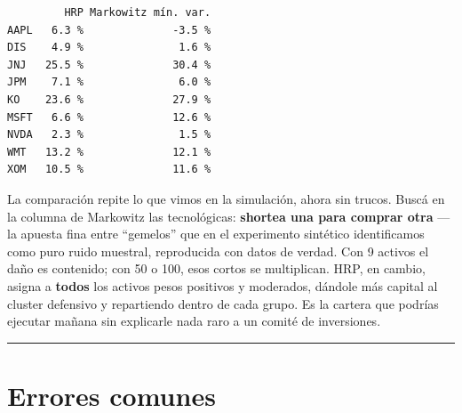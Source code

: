 \documentclass[
  spanish,
  letterpaper,
  DIV=11,
  numbers=noendperiod]{scrreprt}
\begin{document}
\begin{verbatim}
         HRP Markowitz mín. var.
AAPL   6.3 %              -3.5 %
DIS    4.9 %               1.6 %
JNJ   25.5 %              30.4 %
JPM    7.1 %               6.0 %
KO    23.6 %              27.9 %
MSFT   6.6 %              12.6 %
NVDA   2.3 %               1.5 %
WMT   13.2 %              12.1 %
XOM   10.5 %              11.6 %
\end{verbatim}

La comparación repite lo que vimos en la simulación, ahora sin trucos.
Buscá en la columna de Markowitz las tecnológicas: \textbf{shortea una
para comprar otra} --- la apuesta fina entre ``gemelos'' que en el
experimento sintético identificamos como puro ruido muestral,
reproducida con datos de verdad. Con 9 activos el daño es contenido; con
50 o 100, esos cortos se multiplican. HRP, en cambio, asigna a
\textbf{todos} los activos pesos positivos y moderados, dándole más
capital al cluster defensivo y repartiendo dentro de cada grupo. Es la
cartera que podrías ejecutar mañana sin explicarle nada raro a un comité
de inversiones.

\begin{center}\rule{0.5\linewidth}{0.5pt}\end{center}

\chapter{Errores comunes}\label{errores-comunes-7}
\end{document}
